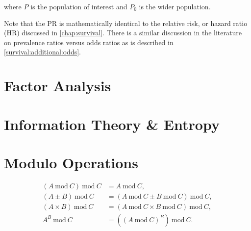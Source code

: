 \noindent where $P$ is the population of interest and $P_{0}$ is the wider population.

Note that the PR is mathematically identical to the relative risk, or hazard ratio (HR) discussed in \cref{chap:survival}.
There is a similar discussion in the literature \cite{pmid27460748,10.3389/fvets.2017.00193}
on prevalence ratios versus odds ratios as is described in \cref{survival:additional:odds}.


\section{Factor Analysis}
\label{misc:factor_ana}

\section{Information Theory \& Entropy}
\label{misc:info_theory}

\section{Modulo Operations}
\label{misc:modulo}

\begin{subequations}\label{eq:misc:modulo}
\begin{align}
\left(A~\text{mod}~C\right)~\text{mod}~C &= A~\text{mod}~C, \label{eq:misc:modulo:basic} \\
\left(A \pm B\right)~\text{mod}~C &= \left(A~\text{mod}~C \pm B~\text{mod}~C\right)~\text{mod}~C, \label{eq:misc:modulo:pm} \\
\left(A \times B\right)~\text{mod}~C &= \left(A~\text{mod}~C \times B~\text{mod}~C\right)~\text{mod}~C, \label{eq:misc:modulo:multiplication} \\
A^{B}~\text{mod}~C &= \left(\left(A~\text{mod}~C\right)^{B}\right)~\text{mod}~C. \label{eq:misc:modulo:exp}
\end{align}
\end{subequations}

